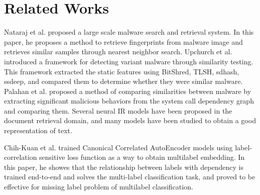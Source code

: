 \section{Related Works}


Nataraj et al. \cite{nataraj2013sarvam} proposed a large scale malware search and retrieval system. In this paper, he proposes a method to retrieve fingerprints from malware image and retrieves similar samples through nearest neighbor search. Upchurch et al. \cite{upchurch2015variant} introduced a framework for detecting variant malware through similarity testing. This framework extracted the static features using BitShred, TLSH, sdhash, ssdeep, and compared them to determine whether they were similar malware. Palahan et al. \cite{palahan2013extraction} proposed a method of comparing similarities between malware by extracting significant malicious behaviors from the system call dependency graph and comparing them. Several neural IR models have been proposed in the document retrieval domain, and many models have been studied to obtain a good representation of text\cite{mitra2017learning,cohen2016end,huang2013learning}.

 Chih-Kuan et al. \cite{yeh2017learning} trained Canonical Correlated AutoEncoder models using label-correlation sensitive loss function as a way to obtain multilabel embedding. In this paper, he showes that the relationship between labels with dependency is trained end-to-end and solves the multi-label classification task, and proved to be effective for missing label problem of multilabel classification.
